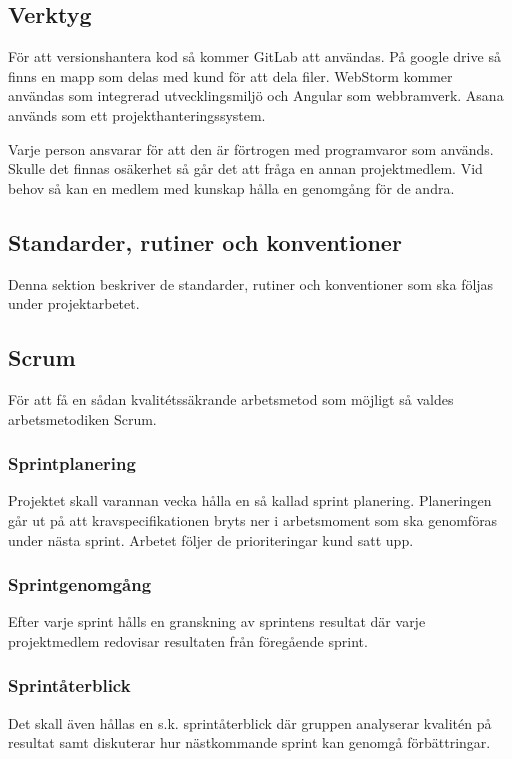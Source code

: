 \documentclass[a4paper,10pt]{article}
\begin{document}
\subsection{Verktyg}

För att versionshantera kod så kommer GitLab att användas. På google drive så finns en mapp som delas med kund för att dela filer. WebStorm kommer användas som integrerad utvecklingsmiljö och Angular som webbramverk. Asana används som ett projekthanteringssystem.

Varje person ansvarar för att den är förtrogen med programvaror som används. Skulle det finnas osäkerhet så går det att fråga en annan projektmedlem. Vid behov så kan en medlem med kunskap hålla en genomgång för de andra.

\subsection{Standarder, rutiner och konventioner}

Denna sektion beskriver de standarder, rutiner och konventioner som ska följas under projektarbetet.

\subsection{Scrum}
För att få en sådan kvalitétssäkrande arbetsmetod som möjligt så valdes arbetsmetodiken Scrum.

\subsubsection{Sprintplanering}
Projektet skall varannan vecka hålla en så kallad sprint planering. Planeringen går ut på att kravspecifikationen bryts ner i arbetsmoment som ska genomföras under nästa sprint. Arbetet följer de prioriteringar kund satt upp.

\subsubsection{Sprintgenomgång}
Efter varje sprint hålls en granskning av sprintens resultat där varje projektmedlem redovisar resultaten från föregående sprint. 

\subsubsection{Sprintåterblick}

Det skall även hållas en s.k. sprintåterblick där gruppen analyserar kvalitén på resultat samt diskuterar hur nästkommande sprint kan genomgå förbättringar.
\end{document}
